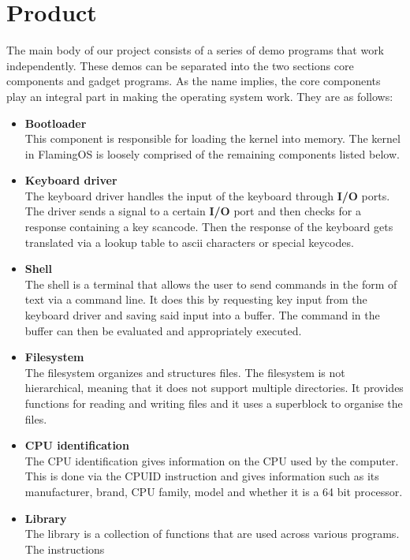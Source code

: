 \section{Product}

The main body of our project consists of a series of demo programs that work independently.
These demos can be separated into the two sections core components and gadget programs.
As the name implies, the core components play an integral part in making the operating
system work. They are as follows:


\begin{itemize}

\item \textbf{Bootloader} \\
This component is responsible for loading the kernel into memory. The kernel in FlamingOS is loosely
comprised of the remaining components listed below.
\item \textbf{Keyboard driver} \\
The keyboard driver handles the input of the keyboard through \textbf{I/O} ports. The driver 
sends a signal to a certain \textbf{I/O} port and then checks for a response containing a key
scancode. Then the response of the keyboard gets translated via a lookup table to ascii characters
or special keycodes.
\item \textbf{Shell} \\
The shell is a terminal that allows the user to send commands in the form of text via a command
line. It does this by requesting key input from the keyboard driver and saving said input
into a buffer. The command in the buffer can then be evaluated and appropriately executed.
\item \textbf{Filesystem} \\
The filesystem organizes and structures files. The filesystem is not hierarchical, meaning
that it does not support multiple directories. It provides functions for reading and writing
files and it uses a superblock to organise the files.
\item \textbf{CPU identification} \\
The CPU identification gives information on the CPU used by the computer. This is done via the 
CPUID instruction and gives information such as its manufacturer, brand, CPU family, model and
whether it is a 64 bit processor.
\item \textbf{Library} \\
The library is a collection of functions that are used across various programs. The instructions

\end{itemize}
